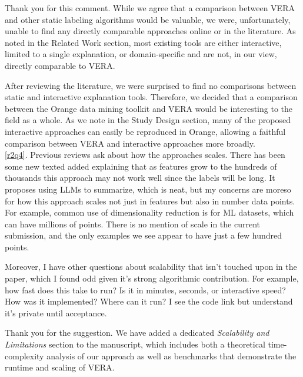 \documentclass{article}
\newcounter{rtaskno}
\newcommand{\rtask}[1]{\refstepcounter{rtaskno}\label{#1}}
\newcommand{\reviewc}[2]{\begin{leftbar}\noindent\rtask{#1}\ref{#1}. #2\end{leftbar}}
\newcommand{\answer}[1]{\noindent #1\\[0mm]}
\newlength{\leftbarwidth}
\newlength{\leftbarsep}
\renewenvironment{leftbar}{%
    \def\FrameCommand{{\color{black}{\vrule width \leftbarwidth\relax\hspace {\leftbarsep}}}}%
    \MakeFramed {\advance \hsize -\width \FrameRestore }%
}{\endMakeFramed}
\begin{document}
\answer{Thank you for this comment. While we agree that a comparison between VERA and other static labeling algorithms would be valuable, we were, unfortunately, unable to find any directly comparable approaches online or in the literature. As noted in the Related Work section, most existing tools are either interactive, limited to a single explanation, or domain-specific and are not, in our view, directly comparable to VERA.

After reviewing the literature, we were surprised to find no comparisons between static and interactive explanation tools. Therefore, we decided that a comparison between the Orange data mining toolkit and VERA would be interesting to the field as a whole. As we note in the Study Design section, many of the proposed interactive approaches can easily be reproduced in Orange, allowing a faithful comparison between VERA and interactive approaches more broadly.}





\reviewc{r2q4}{Previous reviews ask about how the approaches scales. There has been some new texted added explaining that as features grow to the hundreds of thousands this approach may not work well since the labels will be long. It proposes using LLMs to summarize, which is neat, but my concerns are moreso for how this approach scales not just in features but also in number data points. For example, common use of dimensionality reduction is for ML datasets, which can have millions of points. There is no mention of scale in the current submission, and the only examples we see appear to have just a few hundred points.

Moreover, I have other questions about scalability that isn't touched upon in the paper, which I found odd given it's strong algorithmic contribution. For example, how fast does this take to run? Is it in minutes, seconds, or interactive speed? How was it implemented? Where can it run? I see the code link but understand it's private until acceptance.}

\answer{Thank you for the suggestion. We have added a dedicated \textit{Scalability and Limitations} section to the manuscript, which includes both a theoretical time-complexity analysis of our approach as well as benchmarks that demonstrate the runtime and scaling of VERA.}
\end{document}
